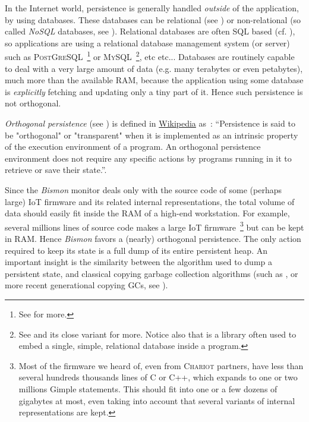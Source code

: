 In the Internet world, persistence is generally handled \emph{outside}
of the application, by using  databases. These
databases can be relational (see \cite{Date:2005:Database-in-Depth})
or non-relational (so called \emph{NoSQL} databases, see
\cite{RAJ-2018-NoSQL}). Relational databases are often SQL based
(cf. \cite{Date:2011:SQL-relth}), so applications are using a
relational database management system (or server) such as
\textsc{PostGreSQL}~\footnote{See  for
  more.} or \textsc{MySQL}~\footnote{See  and
  its close variant  for more. Notice also
  that  is a library often used to embed a
  single, simple, relational database inside a program.}, etc etc...
Databases are routinely capable to deal with a very large amount of
data (e.g. many terabytes or even petabytes), much more than the
available RAM, because the application using some database is
\emph{explicitly} fetching and updating only a tiny part of it. Hence
such persistence is not orthogonal.

\emph{Orthogonal persistence} 
 (see \cite{Dearle-2010-orthopersist})
is defined in
\href{https://en.wikipedia.org/wiki/Persistence\_(computer\_science)\#Orthogonal\_or\_transparent\_persistence}{Wikipedia} as~: ``Persistence is said to be "orthogonal" or "transparent" when it is
implemented as an intrinsic property of the execution environment of a
program. An orthogonal persistence environment does not require any
specific actions by programs running in it to retrieve or save their
state.''.

Since the \emph{Bismon} monitor deals only with the source code of
some (perhaps large) IoT firmware and its related internal
representations, the total volume of data should easily fit inside the
RAM of a high-end workstation. For example, several millions lines of
source code makes a large IoT firmware~\footnote{Most of the firmware
  we heard of, even from \textsc{Chariot} partners, have less than
  several hundreds thousands lines of C or C++, which expands to one
  or two millions Gimple statements. This should fit into one or a few
  dozens of gigabytes at most, even taking into account that several
  variants of internal representations are kept.} but can be kept in
RAM. Hence \emph{Bismon} favors a (nearly) orthogonal persistence. The
only action required to keep its state is a full dump of its entire
persistent heap. An important insight is the similarity between the
algorithm used to dump  a persistent  state, and classical copying garbage collection
 algorithms (such as
\cite{Cheney:1970:CopyingGc}, or more recent generational copying GCs,
see \cite{Jones:2016:GC-handbook}).

